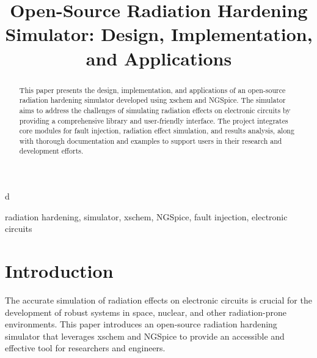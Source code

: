 d\documentclass[conference]{IEEEtran}
\begin{document}
\title{Open-Source Radiation Hardening Simulator: Design, Implementation, and Applications}

\author{
\and
{}
\and
{}
\and
{}
}

\maketitle

\begin{abstract}
This paper presents the design, implementation, and applications of an open-source radiation hardening simulator developed using xschem and NGSpice. The simulator aims to address the challenges of simulating radiation effects on electronic circuits by providing a comprehensive library and user-friendly interface. The project integrates core modules for fault injection, radiation effect simulation, and results analysis, along with thorough documentation and examples to support users in their research and development efforts.
\end{abstract}

\begin{IEEEkeywords}
radiation hardening, simulator, xschem, NGSpice, fault injection, electronic circuits
\end{IEEEkeywords}

\section{Introduction}
The accurate simulation of radiation effects on electronic circuits is crucial for the development of robust systems in space, nuclear, and other radiation-prone environments. This paper introduces an open-source radiation hardening simulator that leverages xschem and NGSpice to provide an accessible and effective tool for researchers and engineers.
\end{document}
